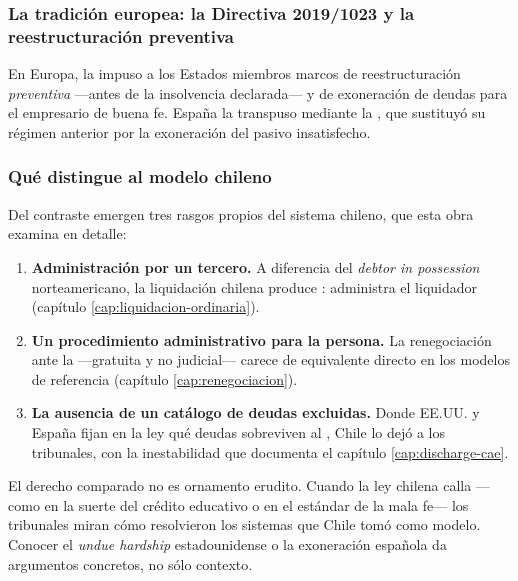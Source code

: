 \subsubsection{La tradición europea: la Directiva 2019/1023 y la reestructuración preventiva}

En Europa, la  \parencite{ue-directiva-2019-1023} impuso a los
Estados miembros marcos de reestructuración \emph{preventiva} ---antes de la insolvencia
declarada--- y de exoneración de deudas para el empresario de buena fe. España la transpuso
mediante la  \parencite{esp-ley16-2022}, que sustituyó su régimen anterior
por la exoneración del pasivo insatisfecho.

\subsubsection{Qué distingue al modelo chileno}

Del contraste emergen tres rasgos propios del sistema chileno, que esta obra examina en detalle:

\begin{enumerate}
  \item \textbf{Administración por un tercero.} A diferencia del \emph{debtor in possession}
  norteamericano, la liquidación chilena produce \desasimiento{}: administra el liquidador
  (capítulo \ref{cap:liquidacion-ordinaria}).
  \item \textbf{Un procedimiento administrativo para la persona.} La renegociación ante la
  \superir{} ---gratuita y no judicial--- carece de equivalente directo en los modelos de
  referencia (capítulo \ref{cap:renegociacion}).
  \item \textbf{La ausencia de un catálogo de deudas excluidas.} Donde EE.UU. y España fijan en
  la ley qué deudas sobreviven al \discharge{}, Chile lo dejó a los tribunales, con la
  inestabilidad que documenta el capítulo \ref{cap:discharge-cae}.
\end{enumerate}

\begin{foco}
El derecho comparado no es ornamento erudito. Cuando la ley chilena calla ---como en la suerte
del crédito educativo o en el estándar de la mala fe--- los tribunales miran cómo resolvieron
los sistemas que Chile tomó como modelo. Conocer el \emph{undue hardship} estadounidense o la
exoneración española da argumentos concretos, no sólo contexto.
\end{foco}

